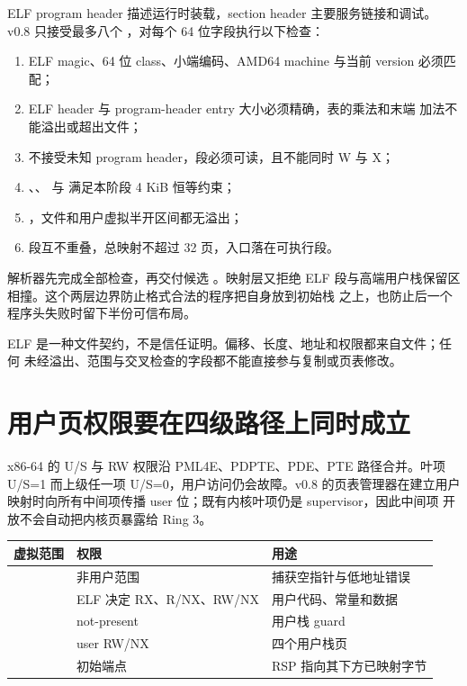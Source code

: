 ELF program header 描述运行时装载，section header 主要服务链接和调试。
v0.8 只接受最多八个 ，对每个 64 位字段执行以下检查：

\begin{enumerate}
  \item ELF magic、64 位 class、小端编码、AMD64 machine 与当前 version
        必须匹配；
  \item ELF header 与 program-header entry 大小必须精确，表的乘法和末端
        加法不能溢出或超出文件；
  \item 不接受未知 program header，段必须可读，且不能同时 W 与 X；
  \item {}、、 与
         满足本阶段 4 KiB 恒等约束；
  \item {}，文件和用户虚拟半开区间都无溢出；
  \item 段互不重叠，总映射不超过 32 页，入口落在可执行段。
\end{enumerate}

解析器先完成全部检查，再交付候选 。映射层又拒绝 ELF
段与高端用户栈保留区相撞。这个两层边界防止格式合法的程序把自身放到初始栈
之上，也防止后一个程序头失败时留下半份可信布局。

\begin{contractbox}
ELF 是一种文件契约，不是信任证明。偏移、长度、地址和权限都来自文件；任何
未经溢出、范围与交叉检查的字段都不能直接参与复制或页表修改。
\end{contractbox}

\section{用户页权限要在四级路径上同时成立}

x86-64 的 U/S 与 RW 权限沿 PML4E、PDPTE、PDE、PTE 路径合并。叶项
U/S=1 而上级任一项 U/S=0，用户访问仍会故障。v0.8 的页表管理器在建立用户
映射时向所有中间项传播 user 位；既有内核叶项仍是 supervisor，因此中间项
开放不会自动把内核页暴露给 Ring 3。

\begin{longtable}{L{0.31\textwidth}L{0.17\textwidth}L{0.38\textwidth}}
\toprule
虚拟范围 & 权限 & 用途\\
\midrule
{} & 非用户范围 & 捕获空指针与低地址错误\\
 & ELF 决定 RX、R/NX、RW/NX & 用户代码、常量和数据\\
 & not-present & 用户栈 guard\\
 & user RW/NX & 四个用户栈页\\
 & 初始端点 & RSP 指向其下方已映射字节\\
\bottomrule
\end{longtable}

